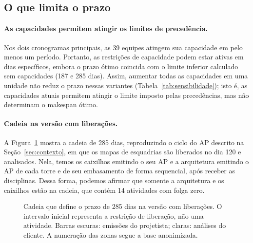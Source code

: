 \subsection{O que limita o prazo}
\label{sec:gargalos}

\paragraph{As capacidades permitem atingir os limites de precedência.}
Nos dois cronogramas principais, as 39 equipes atingem sua capacidade em
pelo menos um período. Portanto, as restrições de capacidade podem estar
ativas em dias específicos, embora o prazo ótimo coincida com o limite
inferior calculado sem capacidades (187 e 285 dias). Assim, aumentar todas as
capacidades em uma unidade não reduz o prazo nessas variantes
(Tabela~\ref{tab:sensibilidade}); isto é, as capacidades atuais permitem atingir
o limite imposto pelas precedências, mas não determinam o makespan ótimo.

\paragraph{Cadeia na versão com liberações.}
A Figura~\ref{fig:gantt} mostra a cadeia de 285 dias, reproduzindo o ciclo
do AP descrito na Seção~\ref{sec:contexto}, em que os mapas de esquadrias são
liberados no dia 120 e analisados. Nela, temos os caixilhos emitindo o seu AP e a
arquitetura emitindo o AP de cada torre e de seu embasamento de forma sequencial,
após receber as disciplinas. Dessa forma, podemos afirmar que somente a arquitetura e os caixilhos estão
na cadeia, que contém 14 atividades com folga zero.

\begin{figure}[htbp]
  \centering
  \caption{Cadeia que define o prazo de 285 dias na versão com liberações.
  O intervalo inicial representa a restrição de liberação, não uma atividade.
  Barras escuras: emissões do projetista; claras: análises do cliente. A
  numeração das zonas segue a base anonimizada.}
  \label{fig:gantt}
\end{figure}

